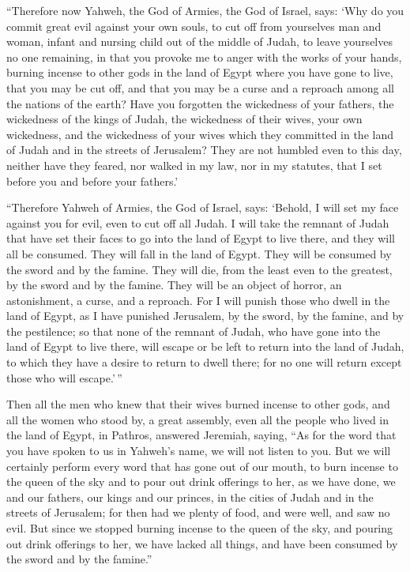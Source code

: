  ``Therefore now Yahweh, the God of Armies, the God of
Israel, says: `Why do you commit great evil against your own souls, to
cut off from yourselves man and woman, infant and nursing child out of
the middle of Judah, to leave yourselves no one remaining,
 in that you provoke me to anger with the works of your
hands, burning incense to other gods in the land of Egypt where you have
gone to live, that you may be cut off, and that you may be a curse and a
reproach among all the nations of the earth?  Have you
forgotten the wickedness of your fathers, the wickedness of the kings of
Judah, the wickedness of their wives, your own wickedness, and the
wickedness of your wives which they committed in the land of Judah and
in the streets of Jerusalem?  They are not humbled even
to this day, neither have they feared, nor walked in my law, nor in my
statutes, that I set before you and before your fathers.'

 ``Therefore Yahweh of Armies, the God of Israel, says:
`Behold, I will set my face against you for evil, even to cut off all
Judah.  I will take the remnant of Judah that have set
their faces to go into the land of Egypt to live there, and they will
all be consumed. They will fall in the land of Egypt. They will be
consumed by the sword and by the famine. They will die, from the least
even to the greatest, by the sword and by the famine. They will be an
object of horror, an astonishment, a curse, and a reproach.
 For I will punish those who dwell in the land of Egypt,
as I have punished Jerusalem, by the sword, by the famine, and by the
pestilence;  so that none of the remnant of Judah, who
have gone into the land of Egypt to live there, will escape or be left
to return into the land of Judah, to which they have a desire to return
to dwell there; for no one will return except those who will
escape.'\,''

 Then all the men who knew that their wives burned
incense to other gods, and all the women who stood by, a great assembly,
even all the people who lived in the land of Egypt, in Pathros, answered
Jeremiah, saying,  ``As for the word that you have spoken
to us in Yahweh's name, we will not listen to you.  But
we will certainly perform every word that has gone out of our mouth, to
burn incense to the queen of the sky and to pour out drink offerings to
her, as we have done, we and our fathers, our kings and our princes, in
the cities of Judah and in the streets of Jerusalem; for then had we
plenty of food, and were well, and saw no evil.  But
since we stopped burning incense to the queen of the sky, and pouring
out drink offerings to her, we have lacked all things, and have been
consumed by the sword and by the famine.''

